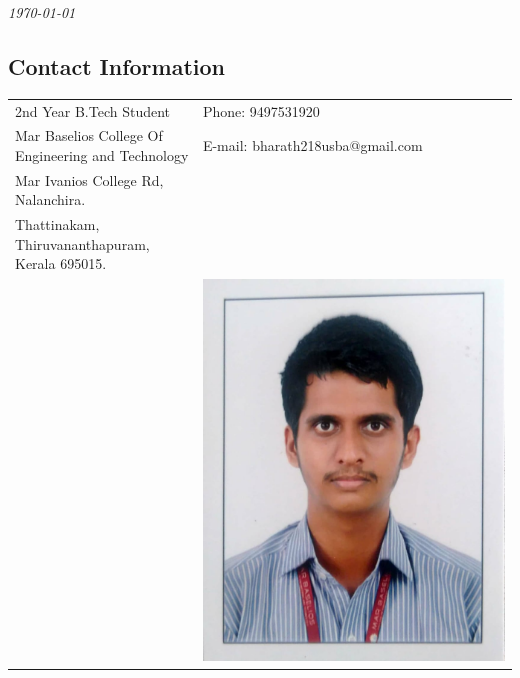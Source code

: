 \documentclass[margin,line]{res}
\begin{document}
 \hfill {\em \today}

\begin{resume}
\section{\sc Contact Information}

\vspace{.05in}
\begin{tabular}{@{}p{3.5in}p{3in}}
2nd  Year B.Tech Student                                                                     & {Phone:}  9497531920 \\
Mar Baselios College Of Engineering
and Technology 
 & {E-mail:}  bharath218usba@gmail.com\\
Mar Ivanios College Rd, Nalanchira.\\
Thattinakam, Thiruvananthapuram, Kerala 695015.\\ 
&
\includegraphics[width=0.1\textheight]{bh}

\end{tabular}

\vspace{.1in}

\end{resume}
\end{document}
